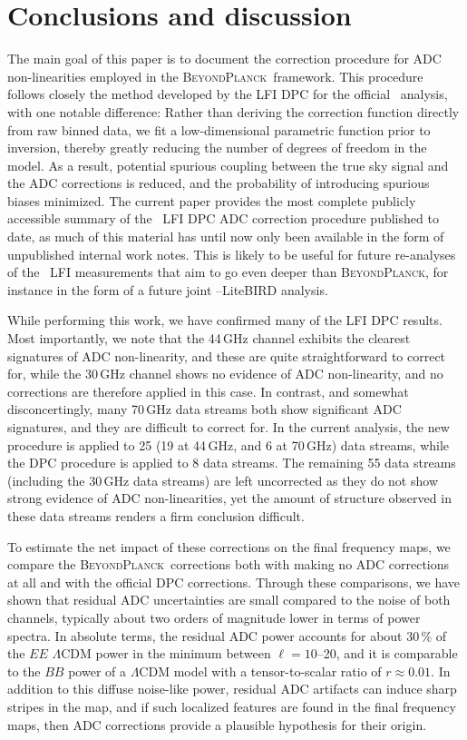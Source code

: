 \documentclass[twocolumn]{aa}
\newcommand{\BP}{\textsc{BeyondPlanck}}
\begin{document}
\section{Conclusions \textbf{and discussion}}
\label{sec:conclusions}

The main goal of this paper is to document the correction procedure for ADC non-linearities employed in the \BP\ framework. This procedure follows closely the method developed by the LFI DPC for the official \Planck\ analysis, with one notable difference: Rather than deriving the correction function directly from raw binned data, we fit a low-dimensional parametric function prior to inversion, thereby greatly reducing the number of degrees of freedom in the model. As a result, potential spurious coupling between the true sky signal and the ADC corrections is reduced, and the probability of introducing spurious biases minimized. The current paper provides the most complete publicly accessible summary of the \Planck\ LFI DPC ADC correction procedure published to date, as much of this material has until now only been available in the form of unpublished internal work notes. This is likely to be useful for future re-analyses of the \Planck\ LFI measurements that aim to go even deeper than \BP, for instance in the form of a future joint \Planck--LiteBIRD analysis. 

While performing this work, we have confirmed many of the LFI DPC results. Most importantly, we note that the 44\,GHz channel exhibits the clearest signatures of ADC non-linearity, and these are quite straightforward to correct for, while the 30\,GHz channel shows no evidence of ADC non-linearity, and no corrections are therefore applied in this case. In contrast, and somewhat disconcertingly, many 70\,GHz data streams both show significant ADC signatures, and they are difficult to correct for. In the current analysis, the new procedure is applied to 25 (19 at 44\,GHz, and 6 at 70\,GHz) data streams, while the DPC procedure is applied to 8 data streams. The remaining 55 data streams (including the 30\,GHz data streams) are left uncorrected as they do not show strong evidence of ADC non-linearities, yet the amount of structure observed in these data streams renders a firm conclusion difficult.

To estimate the net impact of these corrections on the final frequency maps, we compare the \BP\ corrections both with making no ADC corrections at all and with the official DPC corrections. Through these comparisons, we have shown that residual ADC uncertainties are small compared to the noise of both channels, typically about two orders of magnitude lower in terms of power spectra. In absolute terms, the residual ADC power accounts for about 30\,\% of the $EE$ $\Lambda$CDM power in the minimum between $\ell=10$--20, and it is comparable to the $BB$ power of a $\Lambda$CDM model with a tensor-to-scalar ratio of $r\approx0.01$. In addition to this diffuse noise-like power,  residual ADC artifacts can induce sharp stripes in the map, and if such localized features are found in the final frequency maps, then ADC corrections provide a plausible hypothesis for their origin.
\end{document}
